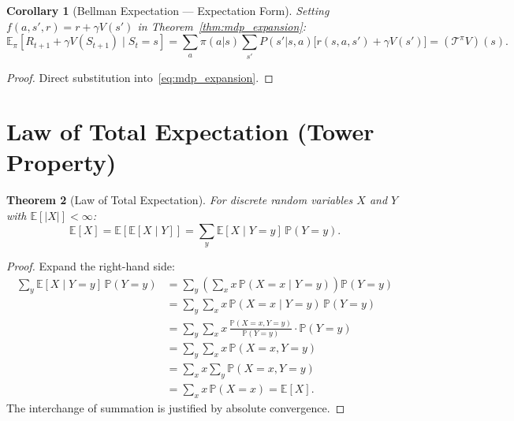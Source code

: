 \documentclass[11pt,a4paper]{article}
\theoremstyle{definition}
\theoremstyle{plain}
\newtheorem{theorem}{Theorem}[section]
\newtheorem{corollary}[theorem]{Corollary}
\theoremstyle{remark}
\newcommand{\E}{\mathbb{E}}
\newcommand{\Prob}{\mathbb{P}}
\begin{document}
\begin{corollary}[Bellman Expectation --- Expectation Form]
\label{cor:bellman_expansion}
Setting $f(a, s', r) = r + \gamma V(s')$ in Theorem~\ref{thm:mdp_expansion}:
\begin{equation}
    \E_\pi[R_{t+1} + \gamma V(S_{t+1}) \mid S_t = s] = \sum_a \pi(a|s) \sum_{s'} P(s'|s,a)\bigl[r(s,a,s') + \gamma V(s')\bigr] = (\mathcal{T}^\pi V)(s).
    \label{eq:bellman_expansion}
\end{equation}
\end{corollary}

\begin{proof}
Direct substitution into~\eqref{eq:mdp_expansion}.
\end{proof}

\section{Law of Total Expectation (Tower Property)}
\label{sec:tower}

\begin{keyresult}
\begin{theorem}[Law of Total Expectation]
\label{thm:tower}
For discrete random variables $X$ and $Y$ with $\E[|X|] < \infty$:
\begin{equation}
    \E[X] = \E\!\left[\E[X \mid Y]\right] = \sum_y \E[X \mid Y = y]\, \Prob(Y = y).
    \label{eq:tower}
\end{equation}
\end{theorem}
\end{keyresult}

\begin{proof}
Expand the right-hand side:
\begin{align}
    \sum_y \E[X \mid Y = y]\, \Prob(Y = y)
    &= \sum_y \left(\sum_x x\, \Prob(X = x \mid Y = y)\right) \Prob(Y = y) \nonumber\\
    &= \sum_y \sum_x x\, \Prob(X = x \mid Y = y)\, \Prob(Y = y) \nonumber\\
    &= \sum_y \sum_x x\, \frac{\Prob(X = x, Y = y)}{\Prob(Y = y)} \cdot \Prob(Y = y) \nonumber\\
    &= \sum_y \sum_x x\, \Prob(X = x, Y = y) \nonumber\\
    &= \sum_x x \sum_y \Prob(X = x, Y = y) \nonumber\\
    &= \sum_x x\, \Prob(X = x) = \E[X]. \label{eq:tower_proof}
\end{align}
The interchange of summation is justified by absolute convergence.
\end{proof}
\end{document}
